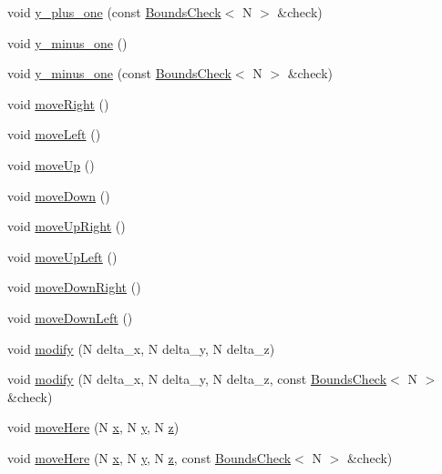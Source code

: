 \begin{DoxyCompactItemize}
\item 
void \hyperlink{struct_pos2_abc24856ae8ef5a4c7bac195193f67e06}{y\-\_\-plus\-\_\-one} (const \hyperlink{struct_bounds_check}{Bounds\-Check}$<$ N $>$ \&check)
\item 
void \hyperlink{struct_pos2_ae42c57baaa5f3c59565a3d864a6c06f1}{y\-\_\-minus\-\_\-one} ()
\item 
void \hyperlink{struct_pos2_a90279c33382f18b737dc2afa901bb4ce}{y\-\_\-minus\-\_\-one} (const \hyperlink{struct_bounds_check}{Bounds\-Check}$<$ N $>$ \&check)
\item 
void \hyperlink{struct_pos2_ae333400e09bd51d4953bd37a6bc4fea9}{move\-Right} ()
\item 
void \hyperlink{struct_pos2_a8744dd1eb4d237f0a7b7c3cd000baed2}{move\-Left} ()
\item 
void \hyperlink{struct_pos2_a579238a3a5615ab36e2407aa6ce9177b}{move\-Up} ()
\item 
void \hyperlink{struct_pos2_abc5361e6f9349c9a5f847f9abd7047e9}{move\-Down} ()
\item 
void \hyperlink{struct_pos2_a815233851b548e25f8f4376f0cfee6f6}{move\-Up\-Right} ()
\item 
void \hyperlink{struct_pos2_a5c7870fae349b5d3a5d643f0ebf2c022}{move\-Up\-Left} ()
\item 
void \hyperlink{struct_pos2_adb6ee58f9bd32c327d3b24002c5cc0b4}{move\-Down\-Right} ()
\item 
void \hyperlink{struct_pos2_aa083f335d346e4f9afa5c4c41e253d46}{move\-Down\-Left} ()
\item 
void \hyperlink{struct_pos2_a3065dacbd8e42b36fd5af0775a9342d8}{modify} (N delta\-\_\-x, N delta\-\_\-y, N delta\-\_\-z)
\item 
void \hyperlink{struct_pos2_ab0ddc65822cce3935319977f3ab7c8e2}{modify} (N delta\-\_\-x, N delta\-\_\-y, N delta\-\_\-z, const \hyperlink{struct_bounds_check}{Bounds\-Check}$<$ N $>$ \&check)
\item 
void \hyperlink{struct_pos2_a8cb8d4f4d076ef9ecbb34bcb351ba8fa}{move\-Here} (N \hyperlink{struct_position_af908be922fc88d89d81be7d08d06f761}{x}, N \hyperlink{struct_position_af434f54a0aad8bbfc3806ebdd197aa3b}{y}, N \hyperlink{struct_position_ac430da98504c2d4fd685c0363d728474}{z})
\item 
void \hyperlink{struct_pos2_a2cf33b5575ca6cd5a02dbc92ee22fe7a}{move\-Here} (N \hyperlink{struct_position_af908be922fc88d89d81be7d08d06f761}{x}, N \hyperlink{struct_position_af434f54a0aad8bbfc3806ebdd197aa3b}{y}, N \hyperlink{struct_position_ac430da98504c2d4fd685c0363d728474}{z}, const \hyperlink{struct_bounds_check}{Bounds\-Check}$<$ N $>$ \&check)

\end{DoxyCompactItemize}
